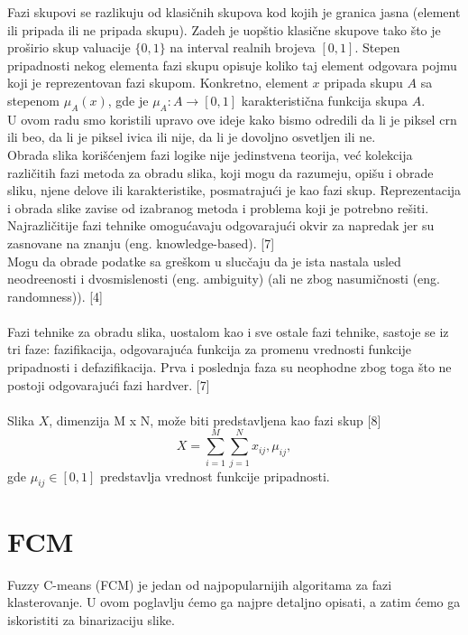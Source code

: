 \documentclass[12pt,a4paper]{article}
\theoremstyle{definition}
\theoremstyle{remark}
\theoremstyle{plain}
\begin{document}
Fazi skupovi se razlikuju od klasi\v cnih skupova kod kojih je granica jasna (element ili pripada ili ne pripada skupu). Zadeh je uop\v stio klasi\v cne skupove tako \v sto je pro\v sirio skup valuacije $\{0, 1\}$ na interval realnih brojeva $[0, 1]$. Stepen pripadnosti nekog elementa fazi skupu opisuje koliko taj element odgovara pojmu koji je reprezentovan fazi skupom. Konkretno, element $x$ pripada skupu $A$ sa stepenom $\mu_{A}(x)$, gde je $\mu_{A} : A \rightarrow [0, 1]$ karakteristi\v cna funkcija skupa $A$.\\

U ovom radu smo koristili upravo ove ideje kako bismo odredili da li je piksel crn ili beo, da li je piksel ivica ili nije, da li je dovoljno osvetljen ili ne.\\

Obrada slika kori\v s\' cenjem fazi logike nije jedinstvena teorija, ve\' c kolekcija razli\v citih fazi metoda za obradu slika, koji mogu da razumeju, opi\v su i 
obrade sliku, njene delove ili karakteristike, posmatraju\' ci je kao fazi skup.
Reprezentacija i obrada slike zavise od izabranog metoda i problema koji je potrebno re\v siti.
Najrazli\v citije fazi tehnike omogu\' cavaju odgovaraju\' ci okvir za napredak jer su zasnovane na znanju (eng. knowledge-based). [7] \\ 
Mogu da obrade podatke sa gre\v skom u sluc\v caju da je ista nastala usled neodre\dj enosti i dvosmislenosti (eng. ambiguity) (ali ne zbog nasumi\v cnosti (eng. randomness)). [4]
\\ \\ 
Fazi tehnike za obradu slika, uostalom kao i sve ostale fazi tehnike, sastoje se iz tri faze: fazifikacija, odgovaraju\' ca funkcija za promenu vrednosti funkcije pripadnosti 
i defazifikacija. Prva i poslednja faza su neophodne zbog toga \v sto ne postoji odgovaraju\' ci fazi hardver. [7]
\\ \\ 
Slika $X$, dimenzija M x N, mo\v ze biti predstavljena kao fazi skup [8]
\begin{equation*}
  X = \sum_{i=1}^{M}\sum_{j=1}^{N} x_{ij}, \mu_{ij},
\end{equation*}
gde $\mu_{ij} \in [0, 1]$ predstavlja vrednost funkcije pripadnosti.


\section{FCM}
\label{sec:FCM}
Fuzzy C-means (FCM) je jedan od najpopularnijih algoritama za fazi klasterovanje. U ovom poglavlju \' cemo ga najpre detaljno opisati, a zatim \' cemo ga iskoristiti za binarizaciju slike.\\
\end{document}
